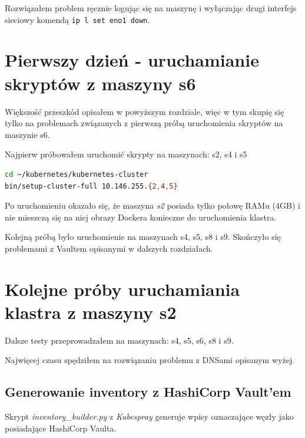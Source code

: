 \documentclass[a4paper,12pt,twoside,openany]{report}
\newcommand{\passthrough}[1]{#1}
\begin{document}
Rozwiązałem problem ręcznie logując się na maszynę i wyłączając drugi
interfejs sieciowy komendą \passthrough{\lstinline!ip l set eno1 down!}.

\hypertarget{pierwszy-dzieux144---uruchamianie-skryptuxf3w-z-maszyny-s6}{%
\section{Pierwszy dzień - uruchamianie skryptów z maszyny
s6}\label{pierwszy-dzieux144---uruchamianie-skryptuxf3w-z-maszyny-s6}}

Większość przeszkód opisałem w powyższym rozdziale, więc w tym skupię
się tylko na problemach związanych z pierwszą próbą uruchomienia
skryptów na maszynie s6.

Najpierw próbowałem uruchomić skrypty na maszynach: s2, s4 i s5

\begin{lstlisting}[language=bash]
cd ~/kubernetes/kubernetes-cluster
bin/setup-cluster-full 10.146.255.{2,4,5}
\end{lstlisting}

Po uruchomieniu okazało się, że maszyna \emph{s2} posiada tylko połowę
RAMu (4GB) i nie mieszczą się na niej obrazy Dockera konieczne do
uruchomienia klastra.

Kolejną próbą było uruchomienie na maszynach s4, s5, s8 i s9. Skończyło
się problemami z Vaultem opisanymi w dalszych rozdziałach.

\hypertarget{kolejne-pruxf3by-uruchamiania-klastra-z-maszyny-s2}{%
\section{Kolejne próby uruchamiania klastra z maszyny
s2}\label{kolejne-pruxf3by-uruchamiania-klastra-z-maszyny-s2}}

Dalsze testy przeprowadzałem na maszynach: s4, s5, s6, s8 i s9.

Najwięcej czasu spędziłem na rozwiązaniu problemu z DNSami opisanym
wyżej.

\hypertarget{generowanie-inventory-z-hashicorp-vaultem}{%
\subsection{Generowanie inventory z HashiCorp
Vault'em}\label{generowanie-inventory-z-hashicorp-vaultem}}

Skrypt \emph{inventory\_builder.py} z \emph{Kubespray} generuje wpisy
oznaczające węzły jako posiadające HashiCorp Vaulta.
\end{document}
